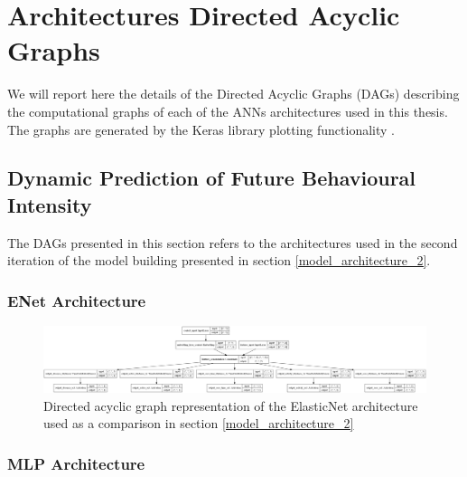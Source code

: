 \chapter{Architectures Directed Acyclic Graphs}
We will report here the details of the Directed Acyclic Graphs (DAGs) describing the computational graphs of each of the ANNs architectures used in this thesis. The graphs are generated by the Keras library plotting functionality \cite{chollet2015keras}.

\section{Dynamic Prediction of Future Behavioural Intensity}
The DAGs presented in this section refers to the architectures used in the second iteration of the model building  presented in section \ref{model_architecture_2}. 

\subsection{ENet Architecture}
\begin{figure}[H]
\centering
\includegraphics[width=\textwidth,height=\textheight,keepaspectratio]{images/appendix_B/enet_2.png}
\caption[\textbf{ElasticNet DAG - Section \ref{model_architecture_2}}]{Directed acyclic graph representation of the ElasticNet architecture used as a comparison in section \ref{model_architecture_2}}
\label{enet_2_dag}
\end{figure}

\subsection{MLP Architecture}


